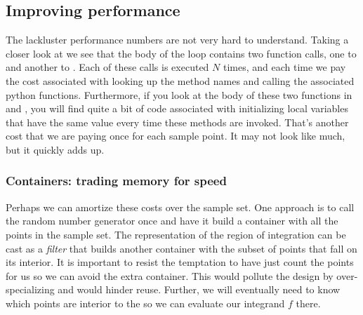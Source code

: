 \subsection{Improving performance}
\label{sec:classes:improved-performane}

The lackluster performance numbers are not very hard to understand. Taking a closer look at
 we see that the body of the loop contains two function calls, one to
 and another to . Each of these calls is executed $N$
times, and each time we pay the cost associated with looking up the method names and calling
the associated python functions. Furthermore, if you look at the body of these two functions in
 and , you will find quite a bit of code
associated with initializing local variables that have the same value every time these methods
are invoked. That's another cost that we are paying once for each sample point. It may not look
like much, but it quickly adds up.

\subsubsection{Containers: trading memory for speed}
\label{sec:classes:containers}

Perhaps we can amortize these costs over the sample set. One approach is to call the random
number generator once and have it build a container with all the points in the sample set. The
representation of the region of integration can be cast as a {\em filter} that builds another
container with the subset of points that fall on its interior. It is important to resist the
temptation to have  just count the points for us so we can avoid the extra
container. This would pollute the design by over-specializing  and would hinder
reuse. Further, we will eventually need to know which points are interior to the 
so we can evaluate our integrand $f$ there.

